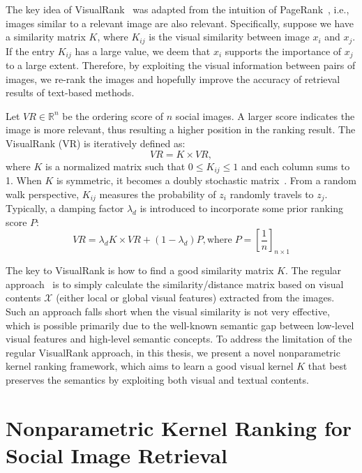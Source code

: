 The key idea of VisualRank~\cite{pami/JingB08} was adapted from the intuition of PageRank~\cite{cn/BrinP98}, i.e., images similar to a relevant image are also relevant. Specifically, suppose we have a similarity matrix $K$, where $K_{ij}$ is the visual similarity between image $x_i$ and $x_j$. If the entry $K_{ij}$ has a large value, we deem that $x_i$ supports the importance of $x_j$ to a large extent. Therefore, by exploiting the visual information between pairs of images, we re-rank the images and hopefully improve the accuracy of retrieval results of text-based methods.


Let $VR \in \mathbb R^n$ be the ordering score of $n$ social images. A larger score indicates the image is more relevant, thus resulting a higher position in the ranking result. The VisualRank (VR) is iteratively defined as:
\[
VR = K \times VR,
\]
where $K$ is a normalized matrix such that $0\leq K_{ij} \leq1$ and each column sums to 1. When $K$ is symmetric, it becomes a doubly stochastic matrix~\cite{HornJ85}. From a random walk perspective, $K_{ij}$ measures the probability of $z_i$ randomly travels to $z_j$. Typically, a damping factor $\lambda_d$ is introduced to incorporate some prior ranking score $P$:
\[
VR = \lambda_d K \times VR + (1 - \lambda_d) P, \mbox{where}\; P = \left[\frac{1}{n}\right]_{n\times 1}
\]

The key to VisualRank is how to find a good similarity matrix $K$. The regular approach~\cite{pami/JingB08} is to simply calculate the similarity/distance matrix based on visual contents $\mathcal{X}$ (either local or global visual features) extracted from the images. Such an approach falls short when the visual similarity is not very effective, which is possible primarily due to the well-known semantic gap between low-level visual features and high-level semantic concepts. To address the limitation of the regular VisualRank approach, in this thesis, we present a novel nonparametric kernel ranking framework, which aims to learn a good visual kernel $K$ that best preserves the semantics by exploiting both visual and textual contents.

\section{Nonparametric Kernel Ranking for Social Image Retrieval} \label{sec:rerank-kernel-learning}


